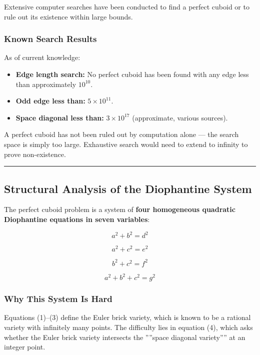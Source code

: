 \documentclass[10pt,a4paper]{article}
\begin{document}
Extensive computer searches have been conducted to find a perfect cuboid or to rule out its existence within large bounds.

\subsubsection{Known Search Results}

As of current knowledge:

\begin{itemize}
    \item \textbf{Edge length search:} No perfect cuboid has been found with any edge less than approximately $10^{10}$.
    \item \textbf{Odd edge less than:} $5 \times 10^{11}$.
    \item \textbf{Space diagonal less than:} $3 \times 10^{17}$ (approximate, various sources).
\end{itemize}

A perfect cuboid has not been ruled out by computation alone --- the search space is simply too large. Exhaustive search would need to extend to infinity to prove non-existence.

\begin{center}
\rule{0.5\textwidth}{0.4pt}
\end{center}

\subsection{Structural Analysis of the Diophantine System}

The perfect cuboid problem is a system of \textbf{four homogeneous quadratic Diophantine equations in seven variables}:

\[a^2 + b^2 = d^2 \tag{1}\]




\[a^2 + c^2 = e^2 \tag{2}\]




\[b^2 + c^2 = f^2 \tag{3}\]




\[a^2 + b^2 + c^2 = g^2 \tag{4}\]

\subsubsection{Why This System Is Hard}

Equations (1)--(3) define the Euler brick variety, which is known to be a rational variety with infinitely many points. The difficulty lies in equation (4), which asks whether the Euler brick variety intersects the ''''space diagonal variety'''' at an integer point.
\end{document}
